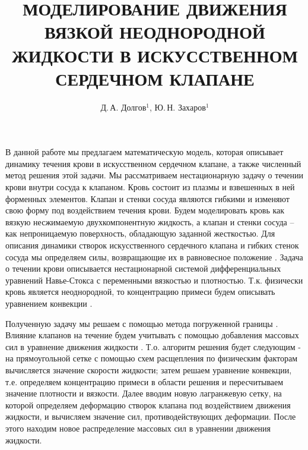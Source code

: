 \documentclass[12pt,a4paper,twoside]{article}
\begin{document}
\title{МОДЕЛИРОВАНИЕ ДВИЖЕНИЯ ВЯЗКОЙ НЕОДНОРОДНОЙ ЖИДКОСТИ В ИСКУССТВЕННОМ СЕРДЕЧНОМ КЛАПАНЕ}

\author{Д.\,А. Долгов$^1$, Ю.\,Н. Захаров$^1$}



 



В данной работе мы предлагаем математическую модель, которая описывает динамику течения крови в искусственном сердечном клапане, а также численный метод решения этой задачи. 
Мы рассматриваем нестационарную задачу о течении крови внутри сосуда к клапаном. Кровь состоит из плазмы и взвешенных в ней форменных элементов. Клапан и стенки сосуда являются гибкими и изменяют свою форму под воздействием течения крови. Будем моделировать кровь как вязкую несжимаемую двухкомпонентную жидкость, а клапан и стенки сосуда – как непроницаемую поверхность, обладающую заданной жесткостью. Для описания динамики створок искусственного сердечного клапана и гибких стенок сосуда мы определяем силы, возвращающие их в равновесное положение \cite{Griffith:Article}. Задача о течении крови описывается нестационарной системой дифференциальных уравнений Навье-Стокса \cite{Zakharov_Milosevic:Article} с переменными вязкостью и плотностью. Т.к. физически кровь является неоднородной, то концентрацию примеси будем описывать уравнением конвекции \cite{Zakharov_Milosevic:Article}.

Полученную задачу мы решаем с помощью метода погруженной границы \cite{Griffith:Article}. Влияние клапанов на течение будем учитывать с помощью добавления массовых сил в уравнение движения жидкости \cite{Griffith:Article}. Т.о. алгоритм решения будет следующим - на прямоугольной сетке с помощью схем расщепления по физическим факторам вычисляется значение скорости жидкости; затем решаем уравнение конвекции, т.е. определяем концентрацию примеси в области решения и пересчитываем значение плотности и вязкости. Далее вводим новую лагранжевую сетку, на которой определяем деформацию створок клапана под воздействием движения жидкости, и вычисляем значение сил, противодействующих деформации. После этого находим новое распределение массовых сил в уравнении движения жидкости.
\end{document}
